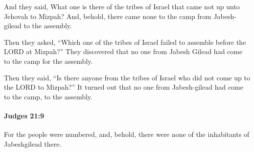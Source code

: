			\begin{versebox}
					\item[BHS] 
					\item[ASV] And they said, What one is there of the tribes of Israel that came not up unto Jehovah to Mizpah? And, behold, there came none to the camp from Jabesh-gilead to the assembly.
					\item[NIV] Then they asked, “Which one of the tribes of Israel failed to assemble before the LORD at Mizpah?” They discovered that no one from Jabesh Gilead had come to the camp for the assembly.
					\item[NRSV] Then they said, “Is there anyone from the tribes of Israel who did not come up to the LORD to Mizpah?” It turned out that no one from Jabesh-gilead had come to the camp, to the assembly.
			\end{versebox}

		\paragraph{Judges 21:9} %
			\label{JUDGES-21-9}

			For the people were numbered, and, behold, there were none of the inhabitants of Jabeshgilead there.

